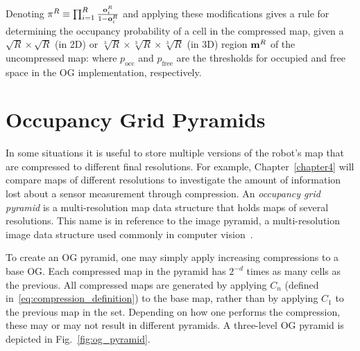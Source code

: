 Denoting $\pi^{R} \equiv
\prod_{i=1}^{R}\frac{\mathbf{o}_{i}^{R}}{1-\mathbf{o}_{i}^{R}}$ and applying
these modifications gives a rule for determining the occupancy probability of a
cell in the compressed map, given a $\sqrt{R}\times\sqrt{R}$ (in 2D) or
$\sqrt[3]{R}\times\sqrt[3]{R}\times\sqrt[3]{R}$ (in 3D) region $\mathbf{m}^{R}$ of
the uncompressed
map:
%
%
where $p_{\text{occ}}$ and $p_{\text{free}}$ are the thresholds for occupied and free space in the OG implementation, respectively.

\section{Occupancy Grid Pyramids}
\label{sec:og_pyramid}

In some situations it is useful to store multiple versions of the robot's map that are compressed
to different final resolutions. For example, Chapter~\ref{chapter4}
will compare maps of different resolutions to
investigate the amount of information lost about a sensor measurement through
compression. An \textit{occupancy grid pyramid} is a multi-resolution map data
structure that holds maps of several resolutions. This name is in reference to the image pyramid,
a multi-resolution image data structure used commonly in computer vision~\cite{adelson1984pyramid}.

To create an OG pyramid, one may simply apply increasing compressions to a base
OG. Each compressed map in the pyramid has $2^{-d}$ times as many
cells as the previous.
%
%
All compressed maps are generated by applying $C_{n}$
(defined in~\eqref{eq:compression_definition})
to the base map, rather than by applying $C_{1}$ to the previous map in the
set. Depending on how one performs the compression, these may or may not result in
different pyramids.
A three-level OG pyramid is depicted in Fig.~\ref{fig:og_pyramid}.

